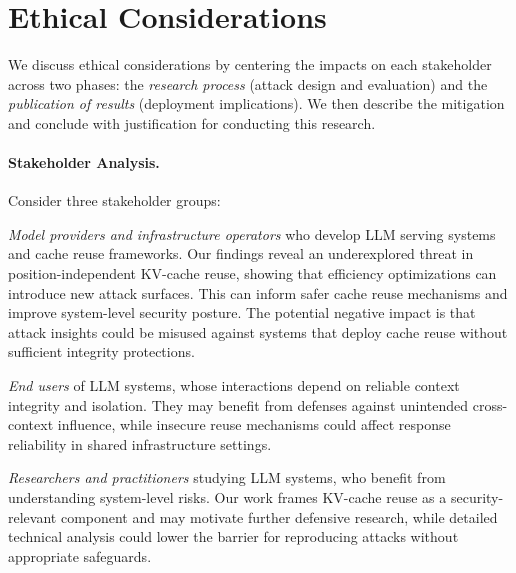 
\section*{Ethical Considerations}
We discuss ethical considerations by centering the impacts on each stakeholder across two phases: the \emph{research process} (attack design and evaluation) and the \emph{publication of results} (deployment implications).
% 
We then describe the mitigation and conclude with justification for conducting this research.

\paragraph{Stakeholder Analysis.}
Consider three stakeholder groups:
\begin{icompact}
\item \emph{Model providers and infrastructure operators} who develop LLM serving systems and cache reuse frameworks. Our findings reveal an underexplored threat in position-independent KV-cache reuse, showing that efficiency optimizations can introduce new attack surfaces. This can inform safer cache reuse mechanisms and improve system-level security posture. The potential negative impact is that attack insights could be misused against systems that deploy cache reuse without sufficient integrity protections.

\item \emph{End users} of LLM systems, whose interactions depend on reliable context integrity and isolation. They may benefit from defenses against unintended cross-context influence, while insecure reuse mechanisms could affect response reliability in shared infrastructure settings.

\item \emph{Researchers and practitioners} studying LLM systems, who benefit from understanding system-level risks. Our work frames KV-cache reuse as a security-relevant component and may motivate further defensive research, while detailed technical analysis could lower the barrier for reproducing attacks without appropriate safeguards.
\end{icompact}

